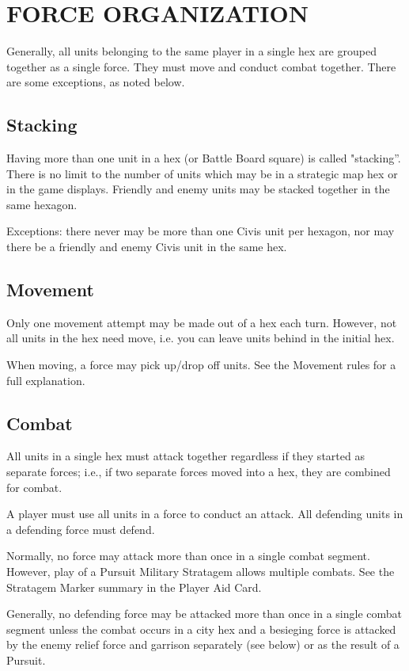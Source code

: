 \section{FORCE ORGANIZATION}

Generally, all units belonging to the same player in a single hex are grouped together as a single force. They must move and conduct combat together. There are some exceptions, as noted below.

\subsection{Stacking}

Having more than one unit in a hex (or Battle Board square) is called "stacking”. There is no limit to the number of units which may be in a strategic map hex or in the game displays. Friendly and enemy units may be stacked together in the same hexagon.

Exceptions: there never may be more than one Civis unit per hexagon, nor may there be a friendly and enemy Civis unit in the same hex.

\subsection{Movement}

Only one movement attempt may be made out of a hex each turn. However, not all units in the hex need move, i.e. you can leave units behind in the initial hex.

When moving, a force may pick up/drop off units. See the Movement rules for a full explanation.

\subsection{Combat}

All units in a single hex must attack together regardless if they started as separate forces; i.e., if two separate forces moved into a hex, they are combined for combat.

A player must use all units in a force to conduct an attack. All defending units in a defending force must defend.

Normally, no force may attack more than once in a single combat segment. However, play of a Pursuit Military Stratagem allows multiple combats. See the Stratagem Marker summary in the Player Aid Card.

Generally, no defending force may be attacked more than once in a single combat segment unless the combat occurs in a city hex and a besieging force is attacked by the enemy relief force and garrison separately (see below) or as the result of a Pursuit.

